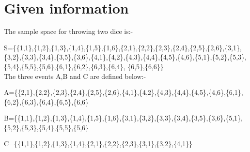 \documentclass{beamer}
\begin{document}
\section{Given information} 
\begin{frame}{}
The sample space for throwing two dice is:-



S=\{\{1,1\},\{1,2\},\{1,3\},\{1,4\},\{1,5\},\{1,6\},\{2,1\},\{2,2\},\{2,3\},\{2,4\},\{2,5\},\{2,6\},\{3,1\},\{3,2\},\{3,3\},\{3,4\},\{3,5\},\{3,6\},\{4,1\},\{4,2\},\{4,3\},\{4,4\},\{4,5\},\{4,6\},\{5,1\},\{5,2\},\{5,3\},\{5,4\},\{5,5\},\{5,6\},\{6,1\},\{6,2\},\{6,3\},\{6,4\},
\{6,5\},\{6,6\}\}\\

The three events A,B and C are defined below:-\\
\item
A=\{\{2,1\},\{2,2\},\{2,3\},\{2,4\},\{2,5\},\{2,6\},\{4,1\},\{4,2\},\{4,3\},\{4,4\},\{4,5\},\{4,6\},\{6,1\},\{6,2\},\{6,3\},\{6,4\},\{6,5\},\{6,6\}\\
\item
B=\{\{1,1\},\{1,2\},\{1,3\},\{1,4\},\{1,5\},\{1,6\},\{3,1\},\{3,2\},\{3,3\},\{3,4\},\{3,5\},\{3,6\},\{5,1\},\{5,2\},\{5,3\},\{5,4\},\{5,5\},\{5,6\}\\
\item
C=\{\{1,1\},\{1,2\},\{1,3\},\{1,4\},\{2,1\},\{2,2\},\{2,3\},\{3,1\},\{3,2\},\{4,1\}\}\\

\end{frame}
\end{document}
